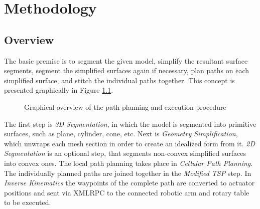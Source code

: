 \chapter{Methodology}

\section{Overview}
The basic premise is to segment the given model, simplify the resultant surface segments, segment the simplified surfaces again if necessary, plan paths on each simplified surface, and stitch the individual paths together.
This concept is presented graphically in Figure \ref{fig:mtdy_overview}.
\begin{figure}[ht]
	\centering
{}
	\caption{Graphical overview of the path planning and execution procedure}
	\label{fig:mtdy_overview}
\end{figure}

The first step is \textit{3D Segmentation}, in which the model is segmented into primitive surfaces, such as plane, cylinder, cone, etc.
Next is \textit{Geometry Simplification}, which unwraps each mesh section in order to create an idealized form from it.
\textit{2D Segmentation} is an optional step, that segments non-convex simplified surfaces into convex ones.
The local path planning takes place in \textit{Cellular Path Planning}.
The individually planned paths are joined together in the \textit{Modified TSP} step.
In \textit{Inverse Kinematics} the waypoints of the complete path are converted to actuator positions and sent via XMLRPC to the connected robotic arm and rotary table to be executed.

